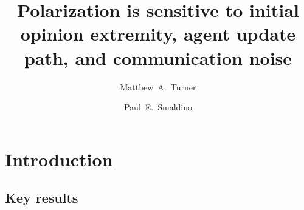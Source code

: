 \documentclass[11pt,letterpaper]{article}
\title{Polarization is sensitive to initial opinion extremity, 
agent update path, and communication noise}
\author[1]{Matthew~A.~Turner}
\author[1]{Paul~E.~Smaldino}
\affil[1]{\footnotesize Cognitive Science Program, University of California, Merced}
\date{}
\begin{document}
\maketitle


\section{Introduction}

\subsection{Key results}
\end{document}
